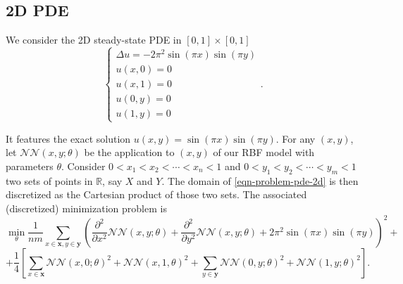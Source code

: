 \documentclass[12pt]{report} %
\newcommand{\tmmathbf}[1]{\ensuremath{\boldsymbol{#1}}}
\newcommand{\mathLaplace}{\Delta}
\begin{document}



\clearpage
\subsection{2D PDE}

We consider the 2D steady-state PDE in $[0, 1] \times [0, 1]$
\begin{equation}
  \left\{\begin{array}{l}
    \mathLaplace u = - 2 \pi^2 \sin (\pi x) \sin (\pi y) \\
    u (x, 0) = 0                                         \\
    u (x, 1) = 0                                         \\
    u (0, y) = 0                                         \\
    u (1, y) = 0
  \end{array}\right. . \label{eqn-problem-pde-2d}
\end{equation}

It features the exact solution $u (x, y) = \sin (\pi x) \sin (\pi y)$. For any
$(x, y)$, let $\mathcal{N}\mathcal{N} (x, y ; \theta)$ be the application to
$(x, y)$ of our RBF model with parameters $\theta$. Consider $0 < x_1 < x_2 <
  \cdots < x_n < 1$ and $0 < y_1 < y_2 < \cdots < y_m < 1$ two sets of points in
$\mathbb{R}$, say $X$ and $Y$. The domain of \eqref{eqn-problem-pde-2d} is
then discretized as the Cartesian product of those two sets. The associated (discretized) minimization problem is
\[ \min_{\theta} \frac{1}{n m} \sum_{x \in \tmmathbf{x}, y \in \tmmathbf{y}}
  \left( \frac{\partial^2}{\partial x^2} \mathcal{N}\mathcal{N} (x, y ;
    \theta) + \frac{\partial^2}{\partial y^2} \mathcal{N}\mathcal{N} (x, y ;
    \theta) + 2 \pi^2 \sin (\pi x) \sin (\pi y) \right)^2 + \]
\[ + \frac{1}{4} \left[ \sum_{x \in \tmmathbf{x}} \mathcal{N}\mathcal{N} (x, 0
    ; \theta)^2 +\mathcal{N}\mathcal{N} (x, 1, \theta)^2 + \sum_{y \in
      \tmmathbf{y}} \mathcal{N}\mathcal{N} (0, y ; \theta)^2
    +\mathcal{N}\mathcal{N} (1, y ; \theta)^2 \right] . \]
\end{document}
